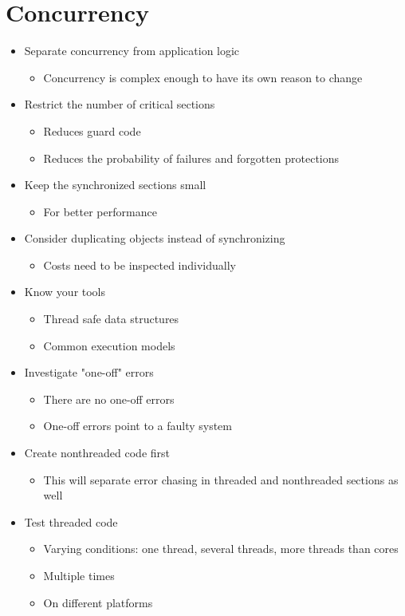 \section{Concurrency}
\begin{itemize}
    \item Separate concurrency from application logic
    \begin{itemize}
        \item Concurrency is complex enough to have its own reason to change
    \end{itemize}
    \item Restrict the number of critical sections
    \begin{itemize}
        \item Reduces guard code
        \item Reduces the probability of failures and forgotten protections
    \end{itemize}
    \item Keep the synchronized sections small
    \begin{itemize}
        \item For better performance
    \end{itemize}
    \item Consider duplicating objects instead of synchronizing
    \begin{itemize}
        \item Costs need to be inspected individually
    \end{itemize}
    \item Know your tools
    \begin{itemize}
        \item Thread safe data structures
        \item Common execution models
    \end{itemize}
    \item Investigate "one-off" errors
    \begin{itemize}
        \item There are no one-off errors
        \item One-off errors point to a faulty system
    \end{itemize}
    \item Create nonthreaded code first
    \begin{itemize}
        \item This will separate error chasing in threaded and nonthreaded sections as well
    \end{itemize}
    \item Test threaded code
    \begin{itemize}
        \item Varying conditions: one thread, several threads, more threads than cores
        \item Multiple times
        \item On different platforms
    \end{itemize}
\end{itemize}
